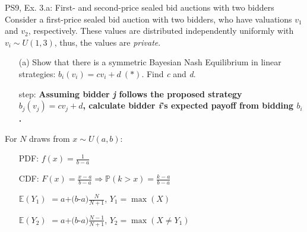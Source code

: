 \begin{frame}{PS9, Ex. 3.a: First- and second-price sealed bid auctions with two bidders}
    Consider a first-price sealed bid auction with two bidders, who have valuations $v_1$ and $v_2$, respectively. These values are distributed independently uniformly with $v_i\sim U(1,3)$, thus, the values are \textit{private}.
    \vspace{-4pt}
    \begin{itemize}
      \item[(a)] Show that there is a symmetric Bayesian Nash Equilibrium in linear strategies: $b_i(v_i) = cv_i + d\ (*)$. Find \textit{c} and \textit{d}.
    \end{itemize}
    \vspace{-8pt}
    \begin{multicols}{2}
      \begin{itemize}
        \item[\nth{1} step:] \textbf{Assuming bidder \textit{j} follows the proposed strategy $b_j(v_j) = cv_j + d$, calculate bidder \textit{i}'s expected payoff from bidding $b_i$.}
      \end{itemize}
      \vfill\null\columnbreak
      For $N$ draws from $x\sim U(a, b):$
      \vspace{-6pt}
      \begin{enumerate}
        \item[PDF:] $f(x)=\frac{1}{b-a}$
        \item[CDF:] $F(x)=\frac{x-a}{b-a}\Rightarrow\mathbb{P}(k>x)=\frac{k-a}{b-a}$
        \item[$\mathbb{E}(Y_1)$] $=a$+$(b$-$a)\frac{N}{N+1}$, $Y_1=\max(X)$
        \item[$\mathbb{E}(Y_2)$] $=a$+$(b$-$a)\frac{N-1}{N+1}$, $Y_2=\max(X\neq Y_1)$
      \end{enumerate}
      \vfill\null
    \end{multicols}
\end{frame}
